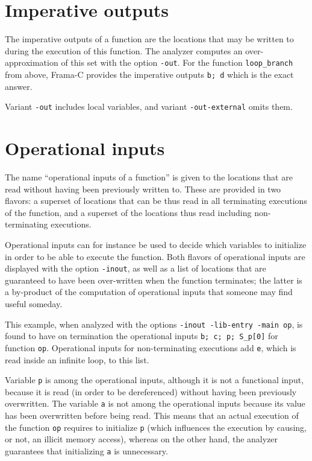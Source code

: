 \documentclass{frama-c-book}
\begin{document}
\section{Imperative outputs}

The imperative outputs of a function are the locations that may
be written to during the execution of this function. The analyzer
computes an over-approximation of this set with the option
\lstinline|-out|. For the function \lstinline|loop_branch| from above,
Frama-C provides the imperative outputs \lstinline|b; d| which is
the exact answer.

Variant \verb|-out| includes local variables, and variant \verb|-out-external| omits them.

\section{Operational inputs}

The name ``operational inputs of a function'' is given to the
locations that are read without having been previously written to.
These are provided in two flavors: a superset of locations that
can be thus read in all terminating executions of the function,
and a superset of the locations thus read including non-terminating
executions.

Operational inputs can for instance be used
to decide which variables to initialize in order to
be able to execute the function.
Both flavors of operational inputs are displayed with
the option \lstinline|-inout|, as well as a list of locations that
are guaranteed to have been over-written when the function terminates;
the latter is a by-product of the computation of operational
inputs that someone may find useful someday.


This example, when analyzed with the options \lstinline|-inout -lib-entry -main op|,
is found to have on termination the operational
inputs \lstinline|b; c; p; S_p[0]| for function \lstinline|op|.
Operational inputs for non-terminating executions add \lstinline|e|, which is
read inside an infinite loop, to this list.

Variable \lstinline|p| is among the operational
inputs, although it is not a functional input, because it is read
(in order to be dereferenced) without having been previously overwritten.
The variable \lstinline|a| is not among the operational inputs because its value
has been overwritten before being read. This means that an actual
execution of the function \lstinline|op| requires to initialize \lstinline|p|
(which influences the execution by causing, or not,
an illicit memory access), whereas on the other hand, the analyzer
guarantees that initializing \lstinline|a| is unnecessary.
\end{document}
